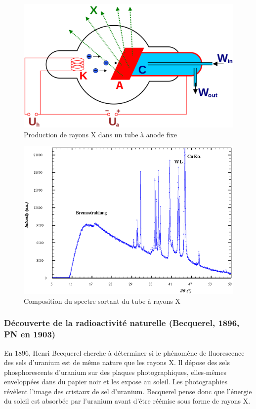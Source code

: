\begin{figure}[ht]
    \centering
    \includegraphics[scale=0.25]{Images1/rayonsxtube.png}
    \caption{Production de rayons X dans un tube à anode fixe}
    \label{fig:tube_rayon_x}
\end{figure}

\begin{figure}[ht]
    \centering
    \includegraphics[scale=0.30]{Images1/rayonnement.PNG}
    \caption{Composition du spectre sortant du tube à rayons X}
    \label{fig:spectre_rayon_x}
\end{figure}

\subsubsection{Découverte de la radioactivité naturelle (Becquerel, 1896, PN en 1903)}

En 1896, Henri Becquerel cherche à déterminer si le phénomène de fluorescence des sels d'uranium est de même nature que les rayons X. Il dépose des sels phosphorescents d'uranium sur des plaques photographiques, elles-mêmes enveloppées dans du papier noir et les expose au soleil. Les photographies révèlent l'image des cristaux de sel d'uranium. Becquerel pense donc que l'énergie du soleil est absorbée par l'uranium avant d'être réémise sous forme de rayons X.

